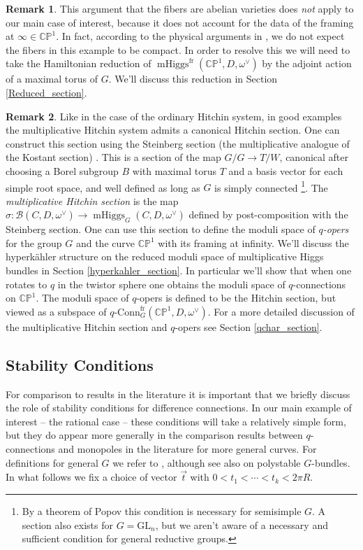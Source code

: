 \documentclass[11pt, oneside, reqno]{amsart}
\theoremstyle{definition} \newtheorem{definition}{Definition}[section]
\theoremstyle{definition} \newtheorem{remark}[definition]{Remark}
\theoremstyle{definition} \newtheorem{remarks}[definition]{Remarks}
\theoremstyle{definition} \newtheorem{question}[definition]{Question}
\theoremstyle{definition} \newtheorem*{note}{Note}
\theoremstyle{definition} \newtheorem{example}[definition]{Example}
\theoremstyle{definition} \newtheorem{examples}[definition]{Examples}
\newcommand{\bb}[1]{\mathbb{#1}}
\newcommand{\mc}[1]{\mathcal{#1}}
\newcommand{\GL}{\mathrm{GL}}
\DeclareMathOperator{\mhiggs}{mHiggs}
\newcommand{\qconn}{q\text{-Conn}}
\newcommand{\fr}{\mathrm{fr}}
\begin{document}
\begin{remark} \label{non_compact_fiber_remark}
This argument that the fibers are abelian varieties does \emph{not} apply to our main case of interest, because it does not account for the data of the framing at $\infty \in \bb{CP}^1$.  In fact, according to the physical arguments in \cite{NekrasovPestun}, we do not expect the fibers in this example to be compact.  In order to resolve this we will need to take the Hamiltonian reduction of $\mhiggs^\fr(\bb{CP}^1, D, \omega^\vee)$ by the adjoint action of a maximal torus of $G$.  We'll discuss this reduction in Section \ref{Reduced_section}.
\end{remark}

\begin{remark} \label{q_opers_remark}
Like in the case of the ordinary Hitchin system, in good examples the multiplicative Hitchin system admits a canonical Hitchin section.  One can construct this section using the Steinberg section (the multiplicative analogue of the Kostant section) \cite{Steinberg}.  This is a section of the map $G/G \to T/W$, canonical after choosing a Borel subgroup $B$ with maximal torus $T$ and a basis vector for each simple root space, and well defined as long as $G$ is simply connected \footnote{By a theorem of Popov \cite{Popov} this condition is necessary for semisimple $G$.  A section also exists for $G = \GL_n$, but we aren't aware of a necessary and sufficient condition for general reductive groups.}.  The \emph{multiplicative Hitchin section} is the map $\sigma \colon \mc B(C,D,\omega^\vee) \to \mhiggs_G(C,D,\omega^\vee)$ defined by post-composition with the Steinberg section.  One can use this section to define the moduli space of \emph{$q$-opers} for the group $G$ and the curve $\bb{CP}^1$ with its framing at infinity.  We'll discuss the hyperk\"ahler structure on the reduced moduli space of multiplicative Higgs bundles in Section \ref{hyperkahler_section}.  In particular we'll show that when one rotates to $q$ in the twistor sphere one obtains the moduli space of $q$-connections on $\bb{CP}^1$.  The moduli space of $q$-opers is defined to be the Hitchin section, but viewed as a subspace of $\qconn^{\fr}_G(\bb{CP}^1,D,\omega^\vee)$.  For a more detailed discussion of the multiplicative Hitchin section and $q$-opers see Section \ref{qchar_section}. 
\end{remark}


\subsection{Stability Conditions} \label{stability_section}
For comparison to results in the literature it is important that we briefly discuss the role of stability conditions for difference connections.  In our main example of interest -- the rational case -- these conditions will take a relatively simple form, but they do appear more generally in the comparison results between $q$-connections and monopoles in the literature for more general curves.  For definitions for general $G$ we refer to \cite{Smith}, although see also \cite{AnchoucheBiswas} on polystable $G$-bundles.  In what follows we fix a choice of vector $\overrightarrow{t}$ with $0 < t_1 < \cdots < t_k < 2\pi R$.
\end{document}
